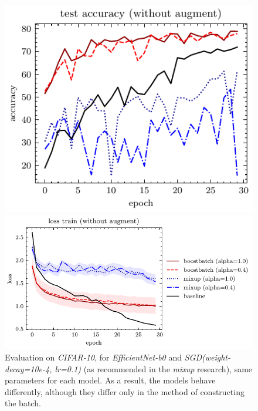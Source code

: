 \documentclass{article}
\begin{document}
\begin{figure}[H]
  \centering
\begin{minipage}{.3\textwidth}
  \hspace{-0.65cm}
  \includegraphics[totalheight=5.6cm]{figure-1-test-accuracy-without-augment}
\end{minipage}
\begin{minipage}{.65\textwidth}\vspace{-0.00cm}\hspace{0.865cm}
  \includegraphics[totalheight=5.6cm]{figure-1-loss-train-without-augment}
\end{minipage}%
\caption{Evaluation on \emph{CIFAR-10}, for \emph{EfficientNet-b0} and
	\emph{SGD(weight-decay=10e-4, lr=0.1)} (as
	recommended in the \emph{mixup} research), same parameters for each model.
	As a result, the models behave differently, although they differ only in the
	method of constructing the batch.}
\label{fig:under}
\end{figure}
\end{document}
